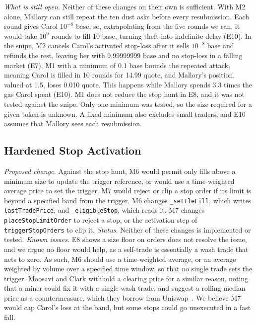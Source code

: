 \emph{What is still open.}
Neither of these changes on their own is sufficient. %
With M2 alone, Mallory can still repeat the ten dust asks before every resubmission. Each round gives Carol $10^{-8}$ base, so, extrapolating from the five rounds we ran, it would take $10^{9}$ rounds to fill 10 base, turning theft into indefinite delay (E10). %
In the snipe, M2 cancels Carol's activated stop-loss after it sells $10^{-8}$ base and refunds the rest, leaving her with 9.99999999 base and no stop-loss in a falling market (E7). %
M1 with a minimum of 0.1 base bounds the repeated attack, meaning Carol is filled in 10 rounds for 14.99 quote, and Mallory's position, valued at 1.5, loses 0.010 quote. This happens while Mallory spends 3.3 times the gas Carol spent (E10). %
M1 does not reduce the stop hunt in E8, and it was not tested against the snipe. %
Only one minimum was tested, so the size required for a given token is unknown. A fixed minimum also excludes small traders, and E10 assumes that Mallory sees each resubmission. %

\subsection{Hardened Stop Activation}\label{sec:m67}
\emph{Proposed change.}
Against the stop hunt, M6 would permit only fills above a minimum size to update the trigger reference, or would use a time-weighted average price to set the trigger. M7 would reject or clip a stop order if its limit is beyond a specified band from the trigger. %
M6 changes \texttt{\_settleFill}, which writes \texttt{lastTradePrice}, and \texttt{\_eligibleStop}, which reads it. M7 changes \texttt{placeStopLimitOrder} to reject a stop, or the activation step of \texttt{triggerStopOrders} to clip it. %
\emph{Status.} Neither of these changes is implemented or tested. %
\emph{Known issues.}
E8 shows a size floor on orders does not resolve the issue, and we argue no floor would help, as a self-trade is essentially a wash trade that nets to zero. %
As such, M6 should use a time-weighted average, or an average weighted by volume over a specified time window, so that no single trade sets the trigger.
Moosavi and Clark withhold a clearing price for a similar reason, noting that a miner could fix it with a single wash trade, and suggest a rolling median price as a countermeasure, which they borrow from Uniswap~\cite{src09moosavi2023}. %
We believe M7 would cap Carol's loss at the band, but some stops could go unexecuted in a fast fall. %

